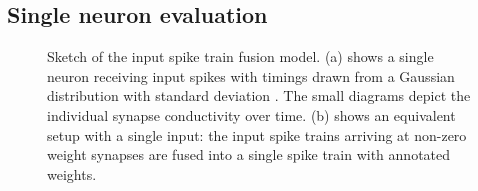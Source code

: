 \subsection{Single neuron evaluation}
\label{sec:single_neuron_evaluation}

\begin{figure}
	\centering
	\caption[Sketch of the input spike train fusion model]{Sketch of the input spike train fusion model. (a) shows a single neuron receiving input spikes with timings drawn from a Gaussian distribution with standard deviation \jitter. The small diagrams depict the individual synapse conductivity over time. (b) shows an equivalent setup with a single input: the input spike trains arriving at non-zero weight synapses are fused into a single spike train with annotated weights.}
	\label{fig:fusion_model}
\end{figure}

